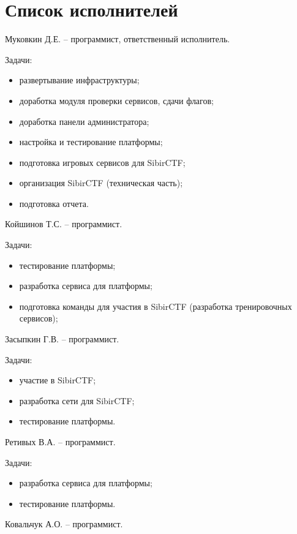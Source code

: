 


 
 
 
 \newpage
 \section*{Список исполнителей}

Муковкин Д.Е. -- программист, ответственный исполнитель.

Задачи:
\begin{itemize}
\item развертывание инфраструктуры;
\item доработка модуля проверки сервисов, сдачи флагов;
\item доработка панели администратора;
\item настройка и тестирование платформы;
\item подготовка игровых сервисов для SibirCTF;
\item организация SibirCTF (техническая часть);
\item подготовка отчета.
\end{itemize}

Койшинов Т.С. -- программист.

Задачи:
\begin{itemize}
\item тестирование платформы;
\item разработка сервиса для платформы;
\item подготовка команды для участия в SibirCTF (разработка тренировочных сервисов);
\end{itemize}

Засыпкин Г.В. -- программист.

Задачи:
\begin{itemize}
\item участие в SibirCTF;
\item разработка сети для SibirCTF;
\item тестирование платформы.
\end{itemize}

Ретивых В.А. -- программист.

Задачи:
\begin{itemize}
\item разработка сервиса для платформы;
\item тестирование платформы.
\end{itemize}

Ковальчук А.О. -- программист.

